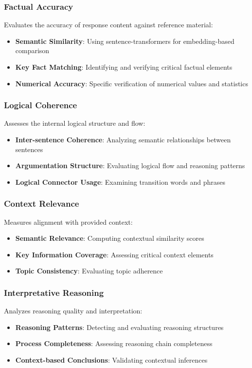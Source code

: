 \subsubsection{Factual Accuracy}
Evaluates the accuracy of response content against reference material:
\begin{itemize}
    \item \textbf{Semantic Similarity}: Using sentence-transformers for embedding-based comparison
    \item \textbf{Key Fact Matching}: Identifying and verifying critical factual elements
    \item \textbf{Numerical Accuracy}: Specific verification of numerical values and statistics
\end{itemize}

\subsubsection{Logical Coherence}
Assesses the internal logical structure and flow:
\begin{itemize}
    \item \textbf{Inter-sentence Coherence}: Analyzing semantic relationships between sentences
    \item \textbf{Argumentation Structure}: Evaluating logical flow and reasoning patterns
    \item \textbf{Logical Connector Usage}: Examining transition words and phrases
\end{itemize}

\subsubsection{Context Relevance}
Measures alignment with provided context:
\begin{itemize}
    \item \textbf{Semantic Relevance}: Computing contextual similarity scores
    \item \textbf{Key Information Coverage}: Assessing critical context elements
    \item \textbf{Topic Consistency}: Evaluating topic adherence
\end{itemize}

\subsubsection{Interpretative Reasoning}
Analyzes reasoning quality and interpretation:
\begin{itemize}
    \item \textbf{Reasoning Patterns}: Detecting and evaluating reasoning structures
    \item \textbf{Process Completeness}: Assessing reasoning chain completeness
    \item \textbf{Context-based Conclusions}: Validating contextual inferences
\end{itemize}

